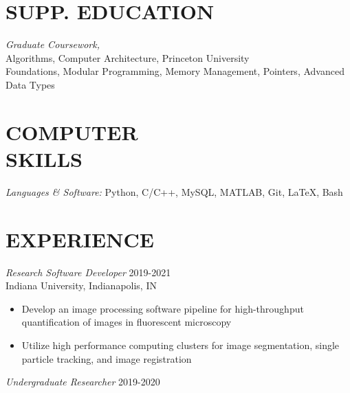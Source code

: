 \documentclass[margin, 10pt]{res} %
\begin{document}
\begin{resume}
\section{SUPP. EDUCATION} 

{\sl Graduate Coursework,} \\
Algorithms, Computer Architecture, Princeton University\\
Foundations, Modular Programming, Memory Management, Pointers, Advanced Data Types



\section{COMPUTER \\ SKILLS} 

{\sl Languages \& Software:} 
Python, C/C++, MySQL, MATLAB, Git, LaTeX, Bash\\
 
 
\section{EXPERIENCE}

{\sl Research Software Developer} \hfill 2019-2021 \\
Indiana University, Indianapolis, IN

\begin{itemize} \itemsep -2pt %

\item Develop an image processing software pipeline for high-throughput quantification of images in fluorescent microscopy

\item Utilize high performance computing clusters for image segmentation, single particle tracking, and image registration
 
\end{itemize}
 
{\sl Undergraduate Researcher} \hfill 2019-2020
\begin{itemize} \itemsep -2pt %


\end{itemize}
\end{resume}
\end{document}

